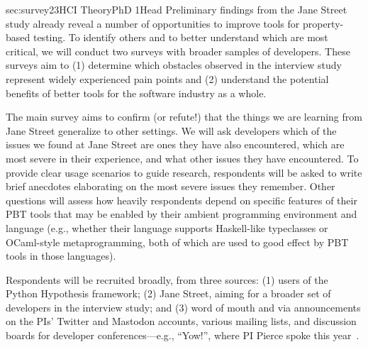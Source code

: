 %
   {sec:survey}{2}{3}{HCI Theory}{PhD 1}{}{Head}
%
Preliminary findings from the Jane Street study already reveal a number of
opportunities to improve tools for property-based testing. To identify
others and to better understand which are most
critical, we will conduct two
surveys with broader samples of developers. These surveys aim to
(1) determine which obstacles observed in the interview
study\iflater{}\fi{}
represent widely experienced pain points and
(2) understand the potential benefits of better tools for the
software industry as a whole.

The main survey
aims to confirm (or refute!) that
the things we are learning from Jane Street generalize to other settings.
We will
ask developers which of the issues we found at Jane Street are
ones they have also encountered, which are most severe
in their experience, and what
other issues they have encountered.
To provide
clear usage scenarios to guide research, respondents will
be asked to write brief anecdotes elaborating on the
most severe issues they remember.  Other questions will assess how
heavily respondents depend on specific features of their PBT tools
that may be enabled by their
ambient programming environment and language (e.g., whether their
language supports Haskell-like typeclasses or OCaml-style
metaprogramming, both of which are used to good effect by
PBT tools in those languages).

Respondents will
be recruited broadly, from three sources: (1)
users of the Python Hypothesis framework; (2) Jane Street, aiming for
a broader set of developers in the interview study; and (3)
word of mouth and via announcements on the PIs' Twitter and Mastodon
accounts, various mailing lists, and discussion boards for developer
conferences---e.g., ``Yow!'', where PI Pierce spoke this
year~\cite{Pierce:Yow22}.

